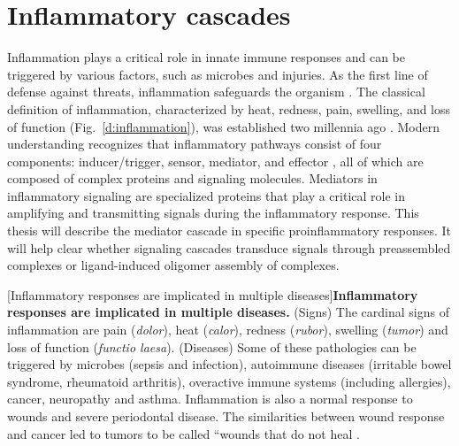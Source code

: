 \section{Inflammatory cascades}
\label{section:inflammation}
Inflammation plays a critical role in innate immune responses \autocite{Newton_2012} and can be triggered by various factors, such as microbes and injuries. As the first line of defense against threats, inflammation safeguards the organism \autocite{Diamond_2022}. The classical definition of inflammation, characterized by heat, redness, pain, swelling, and loss of function (Fig.~\ref{d:inflammation}), was established two millennia ago \autocite{Rather_1971}. Modern understanding recognizes that inflammatory pathways consist of four components: inducer/trigger, sensor, mediator, and effector \autocite{Medzhitov_2008}, all of which are composed of complex proteins and signaling molecules. Mediators in inflammatory signaling are specialized proteins that play a critical role in amplifying and transmitting signals during the inflammatory response. This thesis will describe the mediator cascade in specific proinflammatory responses. It will help clear whether signaling cascades transduce signals through preassembled complexes or ligand-induced oligomer assembly of complexes.


\begin{centering}
\captionsetup{parbox=none}
[Inflammatory responses are implicated in multiple diseases]{\textbf{Inflammatory responses are implicated in multiple diseases.} (Signs) The cardinal signs of inflammation are pain (\emph{dolor}), heat (\emph{calor}), redness (\emph{rubor}), swelling (\emph{tumor}) and loss of function (\emph{functio laesa}). (Diseases) Some of these pathologies can be triggered by microbes (sepsis and infection), autoimmune diseases (irritable bowel syndrome, rheumatoid arthritis), overactive immune systems (including allergies), cancer, neuropathy and asthma. Inflammation is also a normal response to wounds and severe periodontal disease. The similarities between wound response and cancer led to tumors to be called “wounds that do not heal \autocite{Dvorak_1986}.}
\label{d:inflammation}
\end{centering}
 
